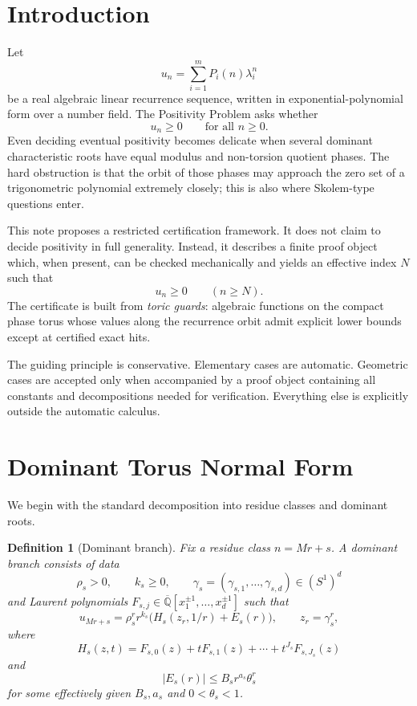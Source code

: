 \documentclass[11pt]{article}
\newtheorem{definition}[theorem]{Definition}
\begin{document}
\section{Introduction}

Let
\[
u_n=\sum_{i=1}^m P_i(n)\lambda_i^n
\]
be a real algebraic linear recurrence sequence, written in exponential-polynomial form over a number field. The Positivity Problem asks whether
\[
u_n\ge 0
\qquad\text{for all }n\ge 0.
\]
Even deciding eventual positivity becomes delicate when several dominant characteristic roots have equal modulus and non-torsion quotient phases. The hard obstruction is that the orbit of those phases may approach the zero set of a trigonometric polynomial extremely closely; this is also where Skolem-type questions enter.

This note proposes a restricted certification framework. It does not claim to decide positivity in full generality. Instead, it describes a finite proof object which, when present, can be checked mechanically and yields an effective index \(N\) such that
\[
u_n\ge 0
\qquad(n\ge N).
\]
The certificate is built from \emph{toric guards}: algebraic functions on the compact phase torus whose values along the recurrence orbit admit explicit lower bounds except at certified exact hits.

The guiding principle is conservative. Elementary cases are automatic. Geometric cases are accepted only when accompanied by a proof object containing all constants and decompositions needed for verification. Everything else is explicitly outside the automatic calculus.

\section{Dominant Torus Normal Form}

We begin with the standard decomposition into residue classes and dominant roots.

\begin{definition}[Dominant branch]
Fix a residue class \(n=Mr+s\). A dominant branch consists of data
\[
\rho_s>0,\qquad k_s\ge 0,\qquad \gamma_s=(\gamma_{s,1},\ldots,\gamma_{s,d})\in (S^1)^d
\]
and Laurent polynomials \(F_{s,j}\in \overline{\mathbb Q}[x_1^{\pm1},\ldots,x_d^{\pm1}]\) such that
\[
u_{Mr+s}
=
\rho_s^r r^{k_s}
\bigl(H_s(z_r,1/r)+E_s(r)\bigr),
\qquad
z_r=\gamma_s^r,
\]
where
\[
H_s(z,t)=F_{s,0}(z)+tF_{s,1}(z)+\cdots+t^{J_s}F_{s,J_s}(z)
\]
and
\[
|E_s(r)|\le B_s r^{a_s}\theta_s^r
\]
for some effectively given \(B_s,a_s\) and \(0<\theta_s<1\).
\end{definition}
\end{document}
